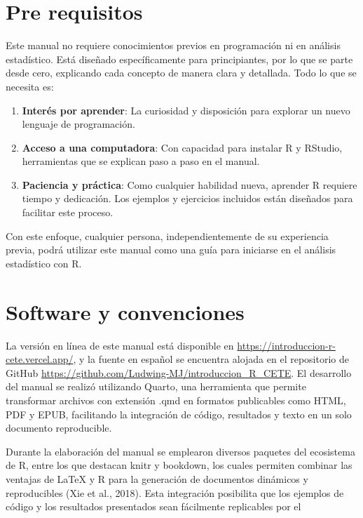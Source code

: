 \documentclass[
  spanish,
  a4paper,
  DIV=11,
  numbers=noendperiod,
  onepage,
  openany]{scrreprt}
\begin{document}
\section*{Pre requisitos}\label{pre-requisitos}


Este manual no requiere conocimientos previos en programación ni en
análisis estadístico. Está diseñado específicamente para principiantes,
por lo que se parte desde cero, explicando cada concepto de manera clara
y detallada. Todo lo que se necesita es:

\begin{enumerate}
\def\labelenumi{\arabic{enumi}.}
\item
  \textbf{Interés por aprender}: La curiosidad y disposición para
  explorar un nuevo lenguaje de programación.
\item
  \textbf{Acceso a una computadora}: Con capacidad para instalar R y
  RStudio, herramientas que se explican paso a paso en el manual.
\item
  \textbf{Paciencia y práctica}: Como cualquier habilidad nueva,
  aprender R requiere tiempo y dedicación. Los ejemplos y ejercicios
  incluidos están diseñados para facilitar este proceso.
\end{enumerate}

Con este enfoque, cualquier persona, independientemente de su
experiencia previa, podrá utilizar este manual como una guía para
iniciarse en el análisis estadístico con R.

\section*{Software y convenciones}\label{software-y-convenciones}


La versión en línea de este manual está disponible en
\url{https://introduccion-r-cete.vercel.app/}, y la fuente en español se
encuentra alojada en el repositorio de GitHub
\url{https://github.com/Ludwing-MJ/introduccion_R_CETE}. El desarrollo
del manual se realizó utilizando Quarto, una herramienta que permite
transformar archivos con extensión .qmd en formatos publicables como
HTML, PDF y EPUB, facilitando la integración de código, resultados y
texto en un solo documento reproducible.

Durante la elaboración del manual se emplearon diversos paquetes del
ecosistema de R, entre los que destacan knitr y bookdown, los cuales
permiten combinar las ventajas de LaTeX y R para la generación de
documentos dinámicos y reproducibles (Xie et al., 2018). Esta
integración posibilita que los ejemplos de código y los resultados
presentados sean fácilmente replicables por el
\end{document}
